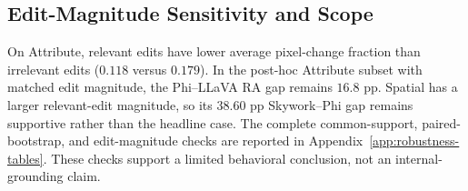 \subsection{Edit-Magnitude Sensitivity and Scope}

On Attribute, relevant edits have lower average pixel-change fraction than
irrelevant edits ($0.118$ versus $0.179$). In the post-hoc Attribute subset with
matched edit magnitude, the Phi--LLaVA RA gap remains $16.8$ pp. Spatial has a
larger relevant-edit magnitude, so its $38.60$ pp Skywork--Phi gap remains
supportive rather than the headline case. The complete common-support,
paired-bootstrap, and edit-magnitude checks are reported in
Appendix~\ref{app:robustness-tables}. These checks support a limited behavioral
conclusion, not an internal-grounding claim.

